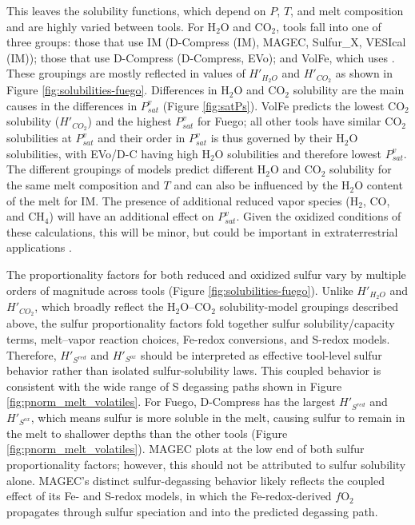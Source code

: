 \documentclass[draft, english]{volcanica-template}
\begin{document}
This leaves the solubility functions, which depend on $P$, $T$, and melt composition and are highly varied between tools. For H$_2$O and CO$_2$, tools fall into one of three groups: those that use IM (D-Compress (IM), MAGEC, Sulfur\_X, VESIcal (IM)); those that use D-Compress (D-Compress, EVo); and VolFe, which uses \textcite{hughes2024modeling}. These groupings are mostly reflected in values of $H'_{H_2O}$ and $H'_{CO_2}$ as shown in Figure \ref{fig:solubilities-fuego}. Differences in H$_2$O and CO$_2$ solubility are the main causes in the differences in $P^v_{sat}$ (Figure \ref{fig:satPs}). VolFe predicts the lowest CO$_2$ solubility ($H'_{CO_2}$) and the highest $P^v_{sat}$ for Fuego; all other tools have similar CO$_2$ solubilities at $P^v_{sat}$ and their order in $P^v_{sat}$ is thus governed by their H$_2$O solubilities, with EVo/D-C having high H$_2$O solubilities and therefore lowest $P^v_{sat}$. The different groupings of models predict different H$_2$O and CO$_2$ solubility for the same melt composition and $T$ and can also be influenced by the H$_2$O content of the melt for IM. The presence of additional reduced vapor species (H$_2$, CO, and CH$_4$) will have an additional effect on $P^v_{sat}$. Given the oxidized conditions of these calculations, this will be minor, but could be important in extraterrestrial applications \parencite{hughes2024}.

The proportionality factors for both reduced and oxidized sulfur vary by multiple orders of magnitude across tools (Figure \ref{fig:solubilities-fuego}). Unlike $H'_{H_2O}$ and $H'_{CO_2}$, which broadly reflect the H$_2$O--CO$_2$ solubility-model groupings described above, the sulfur proportionality factors fold together sulfur solubility/capacity terms, melt--vapor reaction choices, Fe-redox conversions, and S-redox models. Therefore, $H'_{S^{red}}$ and $H'_{S^{ox}}$ should be interpreted as effective tool-level sulfur behavior rather than isolated sulfur-solubility laws. This coupled behavior is consistent with the wide range of S degassing paths shown in Figure \ref{fig:pnorm_melt_volatiles}. For Fuego, D-Compress has the largest $H'_{S^{red}}$ and $H'_{S^{ox}}$, which means sulfur is more soluble in the melt, causing sulfur to remain in the melt to shallower depths than the other tools (Figure \ref{fig:pnorm_melt_volatiles}). MAGEC plots at the low end of both sulfur proportionality factors; however, this should not be attributed to sulfur solubility alone. MAGEC's distinct sulfur-degassing behavior likely reflects the coupled effect of its Fe- and S-redox models, in which the Fe-redox-derived $f$O$_2$ propagates through sulfur speciation and into the predicted degassing path.
\end{document}
